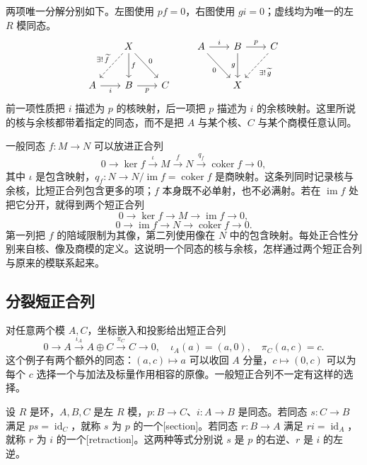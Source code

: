两项唯一分解分别如下。左图使用 \(pf=0\)，右图使用 \(gi=0\)；虚线均为唯一的左 \(R\) 模同态。
\[
	\begin{tikzcd}[column sep=2em,row sep=2.5em]
		&X\arrow[dl,dashed,"\exists!\,\widetilde f"']\arrow[d,"f"]\arrow[dr,"0"]&\\
		A\arrow[r,"i"']&B\arrow[r,"p"']&C
	\end{tikzcd}
	\qquad
	\begin{tikzcd}[column sep=2em,row sep=2.5em]
		A\arrow[r,"i"]\arrow[dr,"0"']&B\arrow[r,"p"]\arrow[d,"g"']&C\arrow[dl,dashed,"\exists!\,\widetilde g"]\\
		&X&
	\end{tikzcd}
\]
前一项性质把 \(i\) 描述为 \(p\) 的核映射，后一项把 \(p\) 描述为 \(i\) 的余核映射。这里所说的核与余核都带着指定的同态，而不是把 \(A\) 与某个核、\(C\) 与某个商模任意认同。

\ProseParagraphBreak
一般同态 \(f:M\to N\) 可以放进正合列
\[
	0\longrightarrow\ker f\xrightarrow{\iota}M\xrightarrow{f}N \xrightarrow{q_f}\operatorname{coker}f\longrightarrow0,
\]
其中 \(\iota\) 是包含映射，\(q_f:N\to N/\operatorname{im}f=\operatorname{coker}f\) 是商映射。这条列同时记录核与余核，比短正合列包含更多的项；\(f\) 本身既不必单射，也不必满射。若在 \(\operatorname{im}f\) 处把它分开，就得到两个短正合列
\[
	0\longrightarrow\ker f\longrightarrow M\longrightarrow\operatorname{im}f\longrightarrow0,
\]
\[
	0\longrightarrow\operatorname{im}f\longrightarrow N\longrightarrow\operatorname{coker}f\longrightarrow0.
\]
第一列把 \(f\) 的陪域限制为其像，第二列使用像在 \(N\) 中的包含映射。每处正合性分别来自核、像及商模的定义。这说明一个同态的核与余核，怎样通过两个短正合列与原来的模联系起来。

\subsection{分裂短正合列}
\label{b2:subsec:0303:02}

对任意两个模 \(A,C\)，坐标嵌入和投影给出短正合列
\begin{equation}\label{b2:eq:standard-split-sequence}
	0\longrightarrow A\xrightarrow{\iota_A}A\oplus C \xrightarrow{\pi_C}C\longrightarrow0, \quad \iota_A(a)=(a,0),\quad \pi_C(a,c)=c.
\end{equation}
这个例子有两个额外的同态：\((a,c)\mapsto a\) 可以收回 \(A\) 分量，\(c\mapsto(0,c)\) 可以为每个 \(c\) 选择一个与加法及标量作用相容的原像。一般短正合列不一定有这样的选择。

\begin{definition}\label{b2:def:section-retraction}
	设 \(R\) 是环，\(A,B,C\) 是左 \(R\) 模，\(p:B\to C\)、\(i:A\to B\) 是同态。若同态 \(s:C\to B\) 满足 \(ps=\operatorname{id}_C\)，就称 \(s\) 为 \(p\) 的一个[section]。若同态 \(r:B\to A\) 满足 \(ri=\operatorname{id}_A\)，就称 \(r\) 为 \(i\) 的一个[retraction]。这两种等式分别说 \(s\) 是 \(p\) 的右逆、\(r\) 是 \(i\) 的左逆。
\end{definition}

